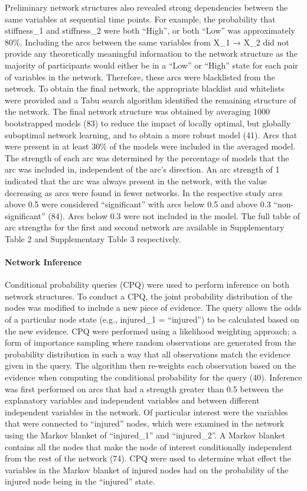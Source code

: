 \documentclass[
  english,
  man]{apa6}
\let\oldparagraph\paragraph
\renewcommand{\paragraph}[1]{\oldparagraph{#1}\mbox{}}
\begin{document}
Preliminary network structures also revealed strong dependencies between the same variables at sequential time points.
For example, the probability that stiffness\_1 and stiffness\_2 were both ``High'', or both ``Low'' was approximately 80\%.
Including the arcs between the same variables from X\_1 → X\_2 did not provide any theoretically meaningful information to the network structure as the majority of participants would either be in a ``Low'' or ``High'' state for each pair of variables in the network.
Therefore, these arcs were blacklisted from the network.
To obtain the final network, the appropriate blacklist and whitelists were provided and a Tabu search algorithm identified the remaining structure of the network.
The final network structure was obtained by averaging 1000 bootstrapped models (83) to reduce the impact of locally optimal, but globally suboptimal network learning, and to obtain a more robust model (41).
Arcs that were present in at least 30\% of the models were included in the averaged model.
The strength of each arc was determined by the percentage of models that the arc was included in, independent of the arc's direction.
An arc strength of 1 indicated that the arc was always present in the network, with the value decreasing as arcs were found in fewer networks.
In the respective study arcs above 0.5 were considered ``significant'' with arcs below 0.5 and above 0.3 ``non-significant'' (84).
Arcs below 0.3 were not included in the model.
The full table of arc strengths for the first and second network are available in Supplementary Table 2 and Supplementary Table 3 respectively.

\hypertarget{network-inference}{%
\paragraph{Network Inference}\label{network-inference}}

Conditional probability queries (CPQ) were used to perform inference on both network structures.
To conduct a CPQ, the joint probability distribution of the nodes was modified to include a new piece of evidence.
The query allows the odds of a particular node state (e.g., injured\_1 = ``injured'') to be calculated based on the new evidence.
CPQ were performed using a likelihood weighting approach; a form of importance sampling where random observations are generated from the probability distribution in such a way that all observations match the evidence given in the query.
The algorithm then re-weights each observation based on the evidence when computing the conditional probability for the query (40).
Inference was first performed on arcs that had a strength greater than 0.5 between the explanatory variables and independent variables and between different independent variables in the network.
Of particular interest were the variables that were connected to ``injured'' nodes, which were examined in the network using the Markov blanket of ``injured\_1'' and ``injured\_2''.
A Markov blanket contains all the nodes that make the node of interest conditionally independent from the rest of the network (74).
CPQ were used to determine what effect the variables in the Markov blanket of injured nodes had on the probability of the injured node being in the ``injured'' state.
\end{document}
